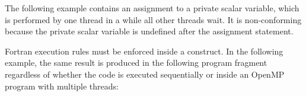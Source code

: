 \begin{fortranspecific}[4ex]

The following example contains an assignment to a private scalar variable, which 
is performed by one thread in a  while all other threads wait. 
It is non-conforming because the private scalar variable is undefined after the 
assignment statement. 


Fortran execution rules must be enforced inside a  construct. 
In the following example, the same result is produced in the following program 
fragment regardless of whether the code is executed sequentially or inside an OpenMP 
program with multiple threads:

\end{fortranspecific}


